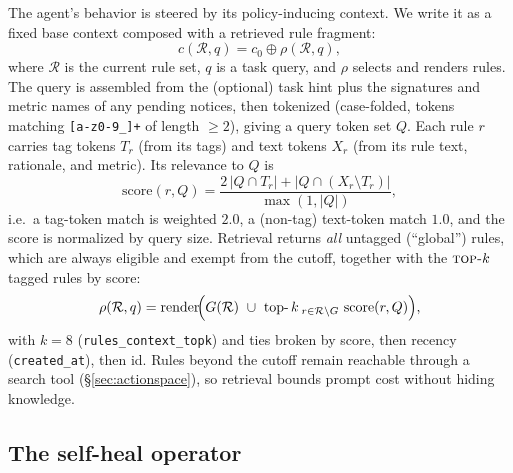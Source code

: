 \documentclass[letterpaper]{article} %
\newcommand{\Rset}{\mathcal{R}}                   %
\newcommand{\topk}{\textsc{top-}k}
\begin{document}
The agent's behavior is steered by its policy-inducing context. We write it as a fixed base
context composed with a retrieved rule fragment:
\begin{equation}
  c(\Rset,q) = c_0 \oplus \rho(\Rset,q),
  \label{eq:context}
\end{equation}
where $\Rset$ is the current rule set, $q$ is a task query, and $\rho$ selects and renders
rules. The query is assembled from the (optional) task hint plus the signatures and metric
names of any pending notices, then tokenized (case-folded, tokens matching \texttt{[a-z0-9\_]+}
of length $\ge 2$), giving a query token set $Q$.
Each rule $r$ carries tag tokens $T_r$ (from its tags) and text tokens $X_r$ (from its rule
text, rationale, and metric). Its relevance to $Q$ is
\begin{equation}
  \mathrm{score}(r,Q) = \frac{2\,\lvert Q \cap T_r\rvert + \lvert Q \cap (X_r \setminus T_r)\rvert}{\max(1,\lvert Q\rvert)} ,
  \label{eq:score}
\end{equation}
i.e.\ a tag-token match is weighted $2.0$, a (non-tag) text-token match $1.0$, and the score is
normalized by query size. Retrieval returns \emph{all} untagged (``global'') rules, which are
always eligible and exempt from the cutoff, together with the $\topk$ tagged rules by score:
\begin{equation}
  \rho(\Rset,q) = \mathrm{render}\!\Bigl( G(\Rset)\ \cup\ \operatorname*{top-}k_{\;r\in \Rset\setminus G}\ \mathrm{score}(r,Q) \Bigr),
  \label{eq:rho}
\end{equation}
with $k=8$ (\texttt{rules\_context\_topk}) and ties broken by score, then recency
(\texttt{created\_at}), then id. Rules beyond the cutoff remain reachable through a search tool
(\S\ref{sec:actionspace}), so retrieval bounds prompt cost without hiding knowledge.

\subsection{The self-heal operator}
\label{sec:healop}
\end{document}
